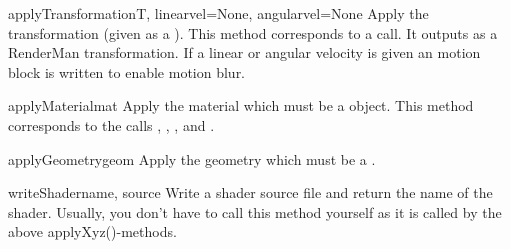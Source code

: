 \begin{methoddesc}[RIBExporter]{applyTransformation}{T, linearvel=None, angularvel=None}
Apply the transformation  (given as a ). This method
corresponds to a  call. 
It outputs  as a RenderMan transformation. If a linear or angular 
velocity is given an motion block is written to enable motion blur.
\end{methoddesc}

\begin{methoddesc}[RIBExporter]{applyMaterial}{mat}
Apply the material  which must be a  object.
This method corresponds to the calls ,
, , 
and .
\end{methoddesc}

\begin{methoddesc}[RIBExporter]{applyGeometry}{geom}
Apply the geometry  which must be a .
\end{methoddesc}

\begin{methoddesc}[RIBExporter]{writeShader}{name, source}
Write a shader source file and return the name of the shader. Usually, 
you don't have to call this method yourself as it is called by the above
applyXyz()-methods.
\end{methoddesc}


